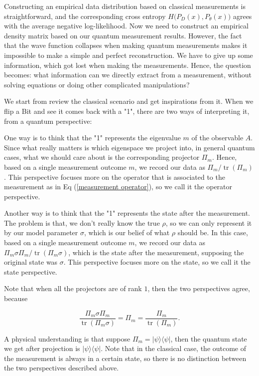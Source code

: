 \documentclass[11pt]{article}
\theoremstyle{definition}
\DeclareMathOperator{\tr}{\text{tr}}
\begin{document}
Constructing an empirical data distribution based on classical measurements is straightforward, and the corresponding cross entropy $H\big(P_D(x), P_{\theta}(x) \big) $ agrees with the average negative log-likelihood. Now we need to construct an empirical density matrix based on our quantum measurement results. However, the fact that the wave function collapses when making quantum measurements makes it impossible to make a simple and perfect reconstruction. We have to give up some information, which got lost when making the measurements. 
Hence, the question becomes: what information can we directly extract from a measurement, without solving equations or doing other complicated manipulations? 

We start from review the classical scenario and get inspirations from it.
When we flip a Bit and see it comes back with a "1", there are two ways of interpreting it, from a quantum perspective:

One way is to think that the "1" represents the eigenvalue $m$ of the observable $A$. Since what really matters is which eigenspace we project into, in general quantum cases, what we should care about is the corresponding projector $\Pi_m$. Hence, based on a single measurement outcome $m$, we record our data as $\Pi_m / \tr(\Pi_m)$. This perspective focuses more on the operator that is associated to the measurement as in Eq (\ref{measurement operator}), so we call it the operator perspective.

Another way is to think that the "1" represents the state after the measurement. The problem is that, we don't really know the true $\rho$, so we can only represent it by our model parameter $\sigma$, which is our belief of what $\rho$ should be. In this case, based on a single measurement outcome $m$, we record our data as $\Pi_m \sigma \Pi_m/\tr(\Pi_m \sigma)$, which is the state after the measurement, supposing the original state was $\sigma$. This perspective focuses more on the state, so we call it the state perspective.

Note that when all the projectors are of rank $1$, then the two perspectives agree, because

\begin{equation}\label{rank1equiv}
    \frac{\Pi_m \sigma \Pi_m}{\tr(\Pi_m \sigma)} = \Pi_m
= \frac{\Pi_m}{\tr(\Pi_m)}.
\end{equation}

A physical understanding is that suppose $\Pi_m = |\psi\rangle \langle \psi|$, then the quantum state we get after projection is $|\psi\rangle \langle \psi|$. Note that in the classical case, the outcome of the measurement is always in a certain state, so there is no distinction between the two perspectives described above. 
\end{document}
